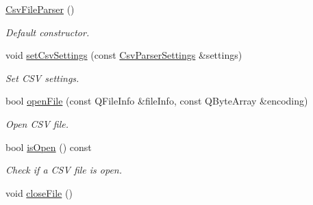 \begin{DoxyCompactItemize}
\item 
\hyperlink{class_mdt_1_1_plain_text_1_1_csv_file_parser_ac7913634006a58b5a5c2b53a3de21a57}{Csv\+File\+Parser} ()\hypertarget{class_mdt_1_1_plain_text_1_1_csv_file_parser_ac7913634006a58b5a5c2b53a3de21a57}{}\label{class_mdt_1_1_plain_text_1_1_csv_file_parser_ac7913634006a58b5a5c2b53a3de21a57}

\begin{DoxyCompactList}\small\item\em Default constructor. \end{DoxyCompactList}\item 
void \hyperlink{class_mdt_1_1_plain_text_1_1_csv_file_parser_ae5a305689ca8b7aaee94f51b95464135}{set\+Csv\+Settings} (const \hyperlink{class_mdt_1_1_plain_text_1_1_csv_parser_settings}{Csv\+Parser\+Settings} \&settings)
\begin{DoxyCompactList}\small\item\em Set C\+SV settings. \end{DoxyCompactList}\item 
bool \hyperlink{class_mdt_1_1_plain_text_1_1_csv_file_parser_a9b81b6061eb86888af9fe51752f8617a}{open\+File} (const Q\+File\+Info \&file\+Info, const Q\+Byte\+Array \&encoding)
\begin{DoxyCompactList}\small\item\em Open C\+SV file. \end{DoxyCompactList}\item 
bool \hyperlink{class_mdt_1_1_plain_text_1_1_csv_file_parser_a2e8e57b7cd46bccf4c6953b9654c73fa}{is\+Open} () const \hypertarget{class_mdt_1_1_plain_text_1_1_csv_file_parser_a2e8e57b7cd46bccf4c6953b9654c73fa}{}\label{class_mdt_1_1_plain_text_1_1_csv_file_parser_a2e8e57b7cd46bccf4c6953b9654c73fa}

\begin{DoxyCompactList}\small\item\em Check if a C\+SV file is open. \end{DoxyCompactList}\item 
void \hyperlink{class_mdt_1_1_plain_text_1_1_csv_file_parser_aee81b90521927b6f8eb1482633c0a67d}{close\+File} ()\hypertarget{class_mdt_1_1_plain_text_1_1_csv_file_parser_aee81b90521927b6f8eb1482633c0a67d}{}\label{class_mdt_1_1_plain_text_1_1_csv_file_parser_aee81b90521927b6f8eb1482633c0a67d}


\end{DoxyCompactItemize}
